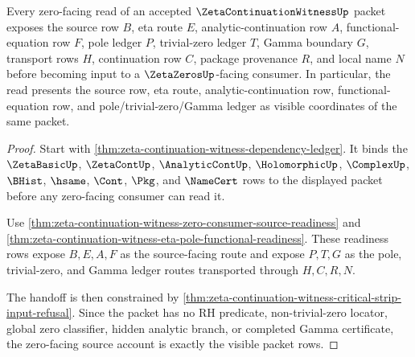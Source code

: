 \begin{theorem}
\label{thm:zeta-continuation-witness-zero-facing-source-accountability}
Every zero-facing read of an accepted $\ZetaContinuationWitnessUp$ packet exposes the source row $B$, eta route $E$, analytic-continuation row $A$, functional-equation row $F$, pole ledger $P$, trivial-zero ledger $T$, Gamma boundary $G$, transport rows $H$, continuation row $C$, package provenance $R$, and local name $N$ before becoming input to a $\ZetaZerosUp$-facing consumer. In particular, the read presents the source row, eta route, analytic-continuation row, functional-equation row, and pole/trivial-zero/Gamma ledger as visible coordinates of the same packet.
\end{theorem}
\begin{proof}
Start with \autoref{thm:zeta-continuation-witness-dependency-ledger}. It binds the $\ZetaBasicUp$, $\ZetaContUp$, $\AnalyticContUp$, $\HolomorphicUp$, $\ComplexUp$, $\BHist$, $\hsame$, $\Cont$, $\Pkg$, and $\NameCert$ rows to the displayed packet before any zero-facing consumer can read it.

Use \autoref{thm:zeta-continuation-witness-zero-consumer-source-readiness} and \autoref{thm:zeta-continuation-witness-eta-pole-functional-readiness}. These readiness rows expose $B,E,A,F$ as the source-facing route and expose $P,T,G$ as the pole, trivial-zero, and Gamma ledger routes transported through $H,C,R,N$.

The handoff is then constrained by \autoref{thm:zeta-continuation-witness-critical-strip-input-refusal}. Since the packet has no RH predicate, non-trivial-zero locator, global zero classifier, hidden analytic branch, or completed Gamma certificate, the zero-facing source account is exactly the visible packet rows.
\end{proof}

